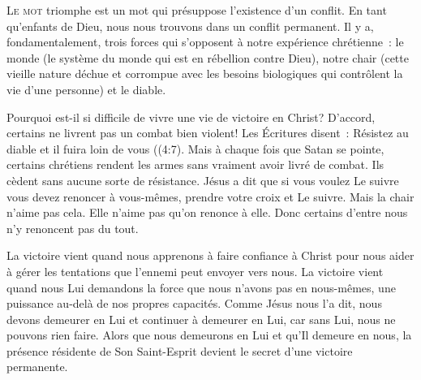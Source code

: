\lettrine{L}{e mot} \Og triomphe \Fg{}
 est un mot qui présuppose l'existence d'un conflit.
 En tant qu'enfants de Dieu,
 nous nous trouvons dans un conflit permanent.
 Il y a, fondamentalement, trois forces qui s'opposent
 à notre expérience chrétienne~: le monde
 (le système du monde qui est en rébellion contre Dieu),
 notre chair (cette vieille nature déchue et corrompue
 avec les besoins biologiques qui contrôlent
 la vie d'une personne) et le diable.


Pourquoi est-il si difficile de vivre une vie de victoire en Christ?
 D'accord, certains ne livrent pas un combat bien violent!
 Les Écritures disent~: 
 \Og Résistez au diable et il fuira loin de vous \Fg{}
 ((4:7).
 Mais à chaque fois que Satan se pointe, certains chrétiens rendent
 les armes sans vraiment avoir livré de combat.
 Ils cèdent sans aucune sorte de résistance.
 Jésus a dit que si vous voulez Le suivre vous devez renoncer à vous-mêmes,
 prendre votre croix et Le suivre.
 Mais la chair n'aime pas cela. Elle n'aime pas qu'on renonce à elle.
 Donc certains d'entre nous n'y renoncent pas du tout.

La victoire vient quand nous apprenons à faire confiance à Christ
 pour nous aider à gérer les tentations que l'ennemi peut envoyer vers nous.
 La victoire vient quand nous Lui demandons la force
 que nous n'avons pas en nous-mêmes, une puissance au-delà
 de nos propres capacités.
 Comme Jésus nous l'a dit, nous devons demeurer en Lui
 et continuer à demeurer en Lui, car sans Lui, nous ne pouvons rien faire.
 Alors que nous demeurons en Lui et qu'Il demeure en nous,
 la présence résidente de Son Saint-Esprit
 devient le secret d'une victoire permanente.

\dvrule





